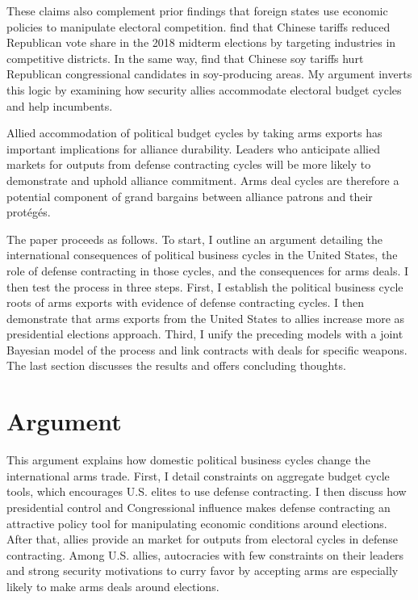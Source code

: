 \documentclass[12pt]{article}
\begin{document}
These claims also complement prior findings that foreign states use economic policies to manipulate electoral competition. 
\citet{KimMargalit2021} find that Chinese tariffs reduced Republican vote share in the 2018 midterm elections by targeting industries in competitive districts.
In the same way, \citet{ChyzhUrbatsch2021} find that Chinese soy tariffs hurt Republican congressional candidates in soy-producing areas. 
My argument inverts this logic by examining how security allies accommodate electoral budget cycles and help incumbents. 


Allied accommodation of political budget cycles by taking arms exports has important implications for alliance durability. 
Leaders who anticipate allied markets for outputs from defense contracting cycles will be more likely to demonstrate and uphold alliance commitment. 
Arms deal cycles are therefore a potential component of grand bargains between alliance patrons and their prot{\'e}g{\'e}s. 


The paper proceeds as follows. 
To start, I outline an argument detailing the international consequences of political business cycles in the United States, the role of defense contracting in those cycles, and the consequences for arms deals. 
I then test the process in three steps. 
First, I establish the political business cycle roots of arms exports with evidence of defense contracting cycles. 
I then demonstrate that arms exports from the United States to allies increase more as presidential elections approach.
Third, I unify the preceding models with a joint Bayesian model of the process and link contracts with deals for specific weapons.
The last section discusses the results and offers concluding thoughts.


\section{Argument}


This argument explains how domestic political business cycles change the international arms trade. 
First, I detail constraints on aggregate budget cycle tools, which encourages U.S. elites to use defense contracting. 
I then discuss how presidential control and Congressional influence makes defense contracting an attractive policy tool for manipulating economic conditions around elections. 
After that, allies provide an market for outputs from electoral cycles in defense contracting. Among U.S. allies, autocracies with few constraints on their leaders and strong security motivations to curry favor by accepting arms are especially likely to make arms deals around elections.
\end{document}
